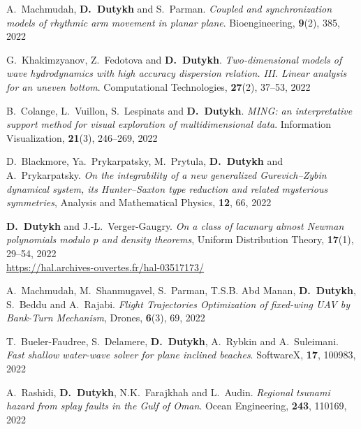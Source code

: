 \begin{etaremune}
  
  \item A.~Machmudah, \textbf{D.~Dutykh} and S.~Parman. \textit{Coupled and synchronization models of rhythmic arm movement in planar plane}. Bioengineering, \textbf{9}(2), 385, 2022 %
  
  \item G.~Khakimzyanov, Z.~Fedotova and \textbf{D.~Dutykh}. \textit{Two-dimensional models of wave hydrodynamics with high accuracy dispersion relation. III. Linear analysis for an uneven bottom}. Computational Technologies, \textbf{27}(2), 37--53, 2022 %
  
  \item B.~Colange, L.~Vuillon, S.~Lespinats and \textbf{D.~Dutykh}. \textit{MING: an interpretative support method for visual exploration of multidimensional data}. Information Visualization, \textbf{21}(3), 246--269, 2022 %
  
  \item D.~Blackmore, Ya.~Prykarpatsky, M.~Prytula, \textbf{D.~Dutykh} and A.~Prykarpatsky. \textit{On the integrability of a new generalized Gurevich--Zybin dynamical system, its Hunter--Saxton type reduction and related mysterious symmetries}, Analysis and Mathematical Physics, \textbf{12}, 66, 2022 %
  
  \item \textbf{D.~Dutykh} and J.-L.~Verger-Gaugry. \textit{On a class of lacunary almost Newman polynomials modulo $p$ and density theorems}, Uniform Distribution Theory, \textbf{17}(1), 29--54, 2022 \\ %
  \url{https://hal.archives-ouvertes.fr/hal-03517173/}
  
  \item A.~Machmudah, M.~Shanmugavel, S.~Parman, T.S.B. Abd Manan, \textbf{D.~Dutykh}, S.~Beddu and A.~Rajabi. \textit{Flight Trajectories Optimization of fixed-wing UAV by Bank-Turn Mechanism}, Drones, \textbf{6}(3), 69, 2022 %
  
  \item T.~Bueler-Faudree, S.~Delamere, \textbf{D.~Dutykh}, A.~Rybkin and A.~Suleimani. \textit{Fast shallow water-wave solver for plane inclined beaches}. SoftwareX, \textbf{17}, 100983, 2022 %
  
  \item A.~Rashidi, \textbf{D.~Dutykh}, N.K.~Farajkhah and L.~Audin. \textit{Regional tsunami hazard from splay faults in the Gulf of Oman}. Ocean Engineering, \textbf{243}, 110169, 2022 %


\end{etaremune}

